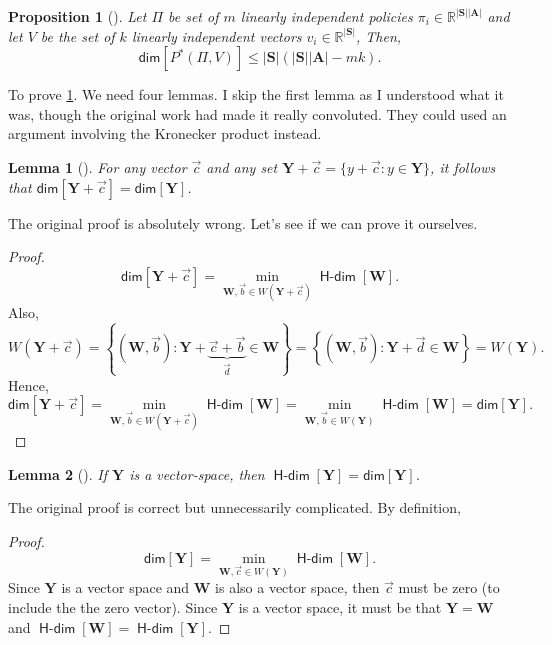 \documentclass[a4paper]{article}
\theoremstyle{definition}
\theoremstyle{remark}
\theoremstyle{plain}
\newtheorem{proposition}{Proposition}
\newtheorem{lemma}{Lemma}
\newcommand{\bA}{\mathbf{A}}
\newcommand{\bS}{\mathbf{S}}
\newcommand{\bW}{\mathbf{W}}
\newcommand{\bY}{\mathbf{Y}}
\newcommand{\R}{\mathbb{R}}
\renewcommand{\dim}{\textsf{dim}}
\DeclareMathOperator{\Hdim}{\textsf{H-dim}}
\begin{document}
%
\begin{proposition}[{\normalfont\citet[Proposition 2]{grimm2020value}}]
    \label{prpstn:mk-lnrly-indpndnt}
    Let $\Pi$ be set of $m$ linearly independent policies $\pi_i \in \R^{|\bS||\bA|}$ and let $V$ be the set of $k$ linearly independent vectors $v_i \in \R^{|\bS|}$, Then,
    \begin{equation*}
        \textsf{dim}[P^*(\Pi, V)] \leq |\bS|(|\bS||\bA| - mk).
    \end{equation*}
\end{proposition}
To prove \cref{prpstn:mk-lnrly-indpndnt}. We need four lemmas. I skip the first lemma as I understood what it was, though the original work had made it really convoluted. They could used an argument involving the Kronecker product instead.
%
\begin{lemma}[{\normalfont\citet[Lemma 2]{grimm2020value}}]
    For any vector $\vec{c}$ and any set $\bY + \vec{c} = \{y + \vec{c}: y \in \bY\}$, it follows that $\textsf{dim}[\bY + \vec{c}] = \textsf{dim}[\bY]$.
\end{lemma}
%
The original proof is absolutely wrong. Let's see if we can prove it ourselves.
\begin{proof}
    \begin{equation*}
        \dim[\bY + \vec{c}] = \min_{\bW, \vec{b} \in W\left(\bY + \vec{c}\right)} \Hdim [\bW].
    \end{equation*}
    Also, 
    \begin{equation*}
        W\left(\bY + \vec{c} \right) = \left\{\left(\bW, \vec{b}\right): \bY + \underbrace{\vec{c} + \vec{b}}_{\vec{d}} \in \bW\right\} = \left\{\left(\bW, \vec{b}\right): \bY + \vec{d} \in \bW\right\} = W(\bY).
    \end{equation*}
    Hence,
    \begin{equation*}
        \dim[\bY + \vec{c}] = \min_{\bW, \vec{b} \in W\left(\bY + \vec{c}\right)} \Hdim [\bW] = \min_{\bW, \vec{b} \in W\left(\bY\right)} \Hdim [\bW] = \dim[\bY].
    \end{equation*}    
\end{proof}
%
\begin{lemma}[{\normalfont\citet[Lemma 3]{grimm2020value}}]
    If $\bY$ is a vector-space, then $\Hdim[\bY] = \dim[\bY]$.
\end{lemma}
%
The original proof is correct but unnecessarily complicated. By definition,
\begin{proof}
    \begin{equation*}
        \dim[\bY] = \min_{\bW, \vec{c} \in W\left(\bY \right)} \Hdim [\bW].
    \end{equation*} 
    Since $\bY$ is a vector space and $\bW$ is also a vector space, then $\vec{c}$ must be zero (to include the the zero vector). Since $\bY$ is a vector space, it must be that $\bY = \bW$ and $\Hdim [\bW] = \Hdim[\bY]$.
\end{proof}
\end{document}

